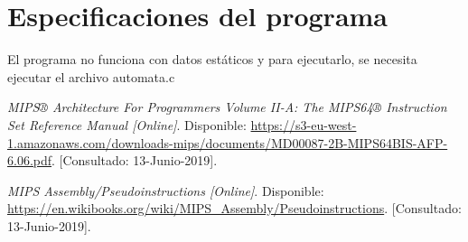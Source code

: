 \documentclass{article}
\begin{document}
\section{Especificaciones del programa}

El programa no funciona con datos estáticos y para ejecutarlo, se necesita ejecutar el archivo automata.c

 \begin{thebibliography}{1}
	\textit{MIPS® Architecture For Programmers Volume II-A: The MIPS64® Instruction Set Reference Manual [Online]}. Disponible:
	\url{https://s3-eu-west-1.amazonaws.com/downloads-mips/documents/MD00087-2B-MIPS64BIS-AFP-6.06.pdf}.
	[Consultado: 13-Junio-2019].

	\textit{MIPS Assembly/Pseudoinstructions [Online]}. Disponible:
	\url{https://en.wikibooks.org/wiki/MIPS_Assembly/Pseudoinstructions}.
	[Consultado: 13-Junio-2019].

\end{thebibliography}
\end{document}
